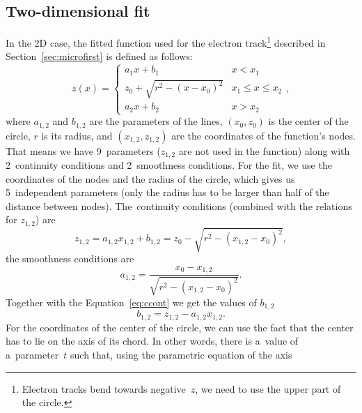 		\subsection{Two-dimensional fit}
			In the 2D case, the fitted function used for the electron track\footnote{Electron tracks bend towards negative~$z$, we need to use the upper part of the circle.} described in Section~\ref{sec:microfirst} is defined as follows:
				\begin{equation}
					\label{eq:clines2d}
					z(x) = \begin{cases}
								a_1x+b_1 & x<x_1\\
								z_0+\sqrt{r^2-(x-x_0)^2} & x_1\leq x\leq x_2\\
								a_2x+b_2 & x>x_2
						   \end{cases},
				\end{equation}
			where $a_{1,2}$ and $b_{1,2}$ are the parameters of the lines, $(x_0,z_0)$ is the center of the circle, $r$ is its radius, and $(x_{1,2},z_{1,2})$ are the coordinates of the function's nodes. That means we have 9~parameters ($z_{1,2}$ are not used in the function) along with 2~continuity conditions and 2~smoothness conditions. For the fit, we use the coordinates of the nodes and the radius of the circle, which gives us 5~independent parameters (only the radius has to be larger than half of the distance between nodes). The~continuity conditions (combined with the relations for $z_{1,2}$) are
				\begin{equation}
					\label{eq:ccont}
					z_{1,2} = a_{1,2}x_{1,2}+b_{1,2} = z_0-\sqrt{r^2-(x_{1,2}-x_0)^2},
				\end{equation}
			the smoothness conditions are
				\begin{equation}
					\label{eq:a12}
					a_{1,2} = \frac{x_0-x_{1,2}}{\sqrt{r^2-(x_{1,2}-x_0)^2}}.
				\end{equation}
			Together with the Equation~\ref{eq:ccont} we get the values of $b_{1,2}$
				\begin{equation}
					\label{eq:b12}
					b_{1,2} = z_{1,2} - a_{1,2} x_{1,2}.
				\end{equation}
			For the coordinates of the center of the circle, we can use the fact that the center has to lie on the axis of its chord. In other words, there is a~value of a~parameter~$t$ such that, using the parametric equation of the axis

